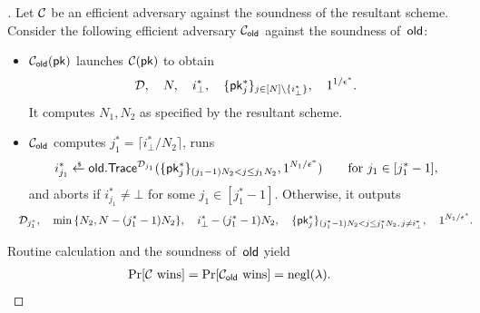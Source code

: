 \begin{proof}[]
Let ${\mathcal{C}}$ be an efficient adversary against the soundness of the resultant scheme.
Consider the following efficient adversary $\scriptC_\OLD$ against the soundness of~$\OLD$:
\begin{itemize}
\item $\scriptC_\OLD(\pk)$ launches $\scriptC(\pk)$ to obtain
\begin{align*}
\scriptD,\quad
N,\quad
i^\ast_\bot,\quad
\{\pk^\ast_j\}_{j\in{[N]\setminus\{i^\ast_\bot\}}},\quad
1^{1/\epsilon^\ast}.
\end{align*}
It computes $N_1,N_2$ as specified by the resultant scheme.
\item $\scriptC_\OLD$ computes ${j^\ast_1=\lceil i^\ast_\bot/N_2\rceil}$, runs
\begin{align*}
i^\ast_{j_1}\draws\OLD.\Trace^{\scriptD_{j_1}}(\{\pk^\ast_j\}_{(j_1-1)N_2<j\leq j_1N_2},1^{N_1/\epsilon^\ast})
\qquad\textup{for }j_1\in[j^\ast_1-1],
\end{align*}
and aborts if ${i^\ast_{j_1}\neq\bot}$ for some ${j_1\in[j^\ast_1-1]}$.
Otherwise, it outputs
\begin{align*}
\WideNarrow{\hspace*{-1em}}{}
\scriptD_{j^\ast_1},\quad
&{}\min{\{N_2,N-(j^\ast_1-1)N_2\}},\quad
i^\ast_\bot-(j^\ast_1-1)N_2,
\WideNarrow{\quad}{\\&}
\{\pk^\ast_j\}_{(j^\ast_1-1)N_2<j\leq j^\ast_1N_2,\,j\neq i^\ast_\bot},\quad
1^{N_1/\epsilon^\ast}.
\end{align*}
\end{itemize}
Routine calculation and the soundness of~$\OLD$ yield
\begin{align*}
\Pr[\scriptC\textup{ wins}]
&{}=
\Pr[\scriptC_\OLD\textup{ wins}]
=
\negl(\lambda).
\qedhere
\end{align*}
\end{proof}

